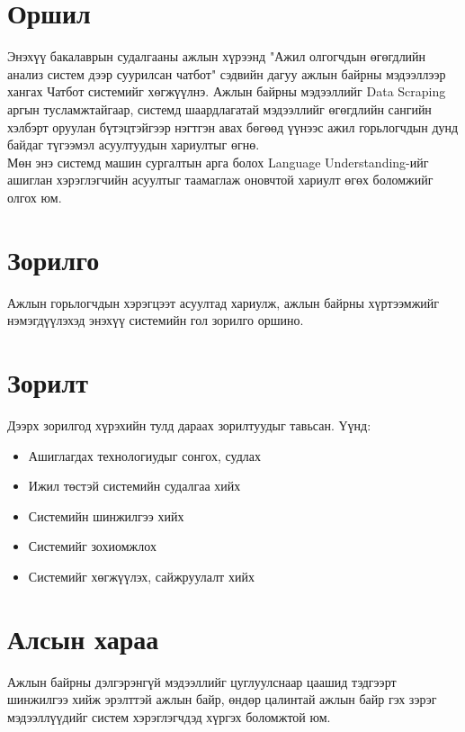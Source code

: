 \section{Оршил}
\quad Энэхүү бакалаврын судалгааны ажлын хүрээнд "Ажил олгогчдын өгөгдлийн анализ систем дээр суурилсан чатбот" сэдвийн дагуу ажлын байрны мэдээллээр хангах Чатбот системийг хөгжүүлнэ. Ажлын байрны мэдээллийг Data Scraping аргын тусламжтайгаар, системд шаардлагатай мэдээллийг өгөгдлийн сангийн хэлбэрт оруулан бүтэцтэйгээр нэгтгэн авах бөгөөд үүнээс ажил горьлогчдын дунд байдаг түгээмэл асуултуудын хариултыг өгнө.
\\Мөн энэ системд машин сургалтын арга болох Language Understanding-ийг ашиглан хэрэглэгчийн асуултыг таамаглаж оновчтой хариулт өгөх боломжийг олгох юм. 
\section{Зорилго}
\quad Ажлын горьлогчдын хэрэгцээт асуултад хариулж, ажлын байрны хүртээмжийг нэмэгдүүлэхэд энэхүү системийн гол зорилго оршино.
\section{Зорилт}
\quad Дээрх зорилгод хүрэхийн тулд дараах зорилтуудыг тавьсан. Үүнд:
\begin{itemize}
	\item Ашиглагдах технологиудыг сонгох, судлах
	\item Ижил төстэй системийн судалгаа хийх
	\item Системийн шинжилгээ хийх
	\item Системийг зохиомжлох
	\item Системийг хөгжүүлэх, сайжруулалт хийх
\end{itemize}
\section{Алсын хараа}
\quad Ажлын байрны дэлгэрэнгүй мэдээллийг цуглуулснаар цаашид тэдгээрт шинжилгээ хийж  эрэлттэй ажлын байр, өндөр цалинтай ажлын байр гэх зэрэг мэдээллүүдийг систем хэрэглэгчдэд хүргэх боломжтой юм. 